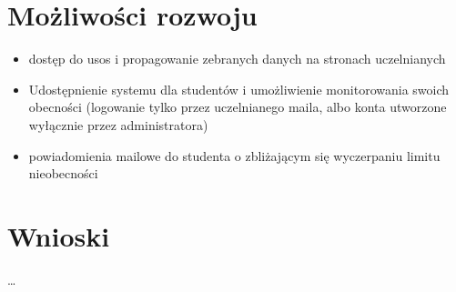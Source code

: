 \documentclass[declaration,shortabstract, mgr]{iithesis}
\begin{document}
\chapter{Możliwości rozwoju}
\begin{itemize}
\item dostęp do usos i propagowanie zebranych danych na stronach uczelnianych
\item Udostępnienie systemu dla studentów i umożliwienie monitorowania swoich obecności (logowanie tylko przez uczelnianego maila, albo konta utworzone wyłącznie przez administratora)
\item powiadomienia mailowe do studenta o zbliżającym się wyczerpaniu limitu nieobecności
\end{itemize}

\chapter{Wnioski}

\ldots


\end{document}
